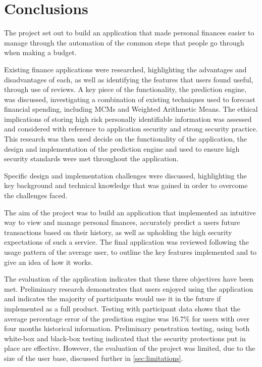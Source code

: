 \chapter{Conclusions}
\label{cha:conclusions}

\begin{comment}
Chapter 7: Conclusions
This can be a short chapter summarizing what you have achieved and what you have learned from the achievement. It is different from the abstract. The main results of your work should be highlighted with a critical appraisal of them indicating the extent to which the objectives outlined in Chapter 1 have been met. Exaggerated claims are counterproductive here. Recommendations for further activity are often included in this chapter.
\end{comment}

The project set out to build an application that made personal finances easier to manage through the automation of the common steps that people go through when making a budget.

Existing finance applications were researched, highlighting the advantages and disadvantages of each, as well as identifying the features that users found useful, through use of reviews.
%
A key piece of the functionality, the prediction engine, was discussed, investigating a combination of existing techniques used to forecast financial spending, including MCMs and Weighted Arithmetic Means. 
%
The ethical implications of storing high risk personally identifiable information was assessed and considered with reference to application security and strong security practice.
%
This research was then used decide on the functionality of the application, the design and implementation of the prediction engine and used to ensure high security standards were met throughout the application.

Specific design and implementation challenges were discussed, highlighting the key background and technical knowledge that was gained in order to overcome the challenges faced.

The aim of the project was to build an application that implemented an intuitive way to view and manage personal finances, accurately predict a users future \glspl{transaction} based on their history, as well as upholding the high security expectations of such a service.
%
The final application was reviewed following the usage pattern of the average user, to outline the key features implemented and to give an idea of how it works.

The evaluation of the application indicates that these three objectives have been met. Preliminary research demonstrates that users enjoyed using the application and indicates the majority of participants would use it in the future if implemented as a full product. Testing with participant data shows that the average percentage error of the prediction engine was 16.7\% for users with over four months historical information. Preliminary penetration testing, using both white-box and black-box testing indicated that the security protections put in place are effective.  However, the evaluation of the project was limited, due to the size of the user base, discussed further in \autoref{sec:limitations}.

